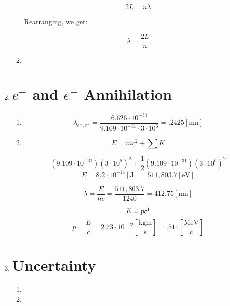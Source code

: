 \begin{enumerate}
\begin{enumerate}
        $$2L=n\lambda$$

        Rearranging, we get:

        $$\lambda=\frac{2L}{n}$$

      \item 

    \end{enumerate}

  \item

    \section*{$e^-$ and $e^+$ Annihilation}

    \begin{enumerate}

      \item 

        $$\lambda_{e^-,e^+}=\frac{6.626\cdot10^{-34}}{9.109\cdot10^{-31}\cdot3\cdot10^{6}}=.2425[\si{\nano\meter}]$$

      \item 

        $$E=mc^2+\sum K$$

        $$\left( 9.109\cdot10^{-31} \right)\left( 3\cdot10^{8} \right)^2+\frac{1}{2}\left( 9.109\cdot10^{-31} \right)\left( 3\cdot10^6 \right)^2$$
        $$E=8.2\cdot10^{-14}[\si{\joule}]=511,803.7[\si{\eV}]$$

        $$\lambda=\frac{E}{hc}=\frac{511,803.7}{1240}=412.75[\si{\nano\meter}]$$

        $$E=pc\footnote{for photons}$$
        $$p=\frac{E}{c}=2.73\cdot10^{-22}\left[ \frac{\si{\kilo\gram\meter}}{\si{\second}} \right]=.511\left[ \frac{\si{\mega\eV}}{\text{c}} \right]$$

    \end{enumerate}

  \item

    \section*{Uncertainty}

    \begin{enumerate}

      \item 

      \item 

    \end{enumerate}

\end{enumerate}



